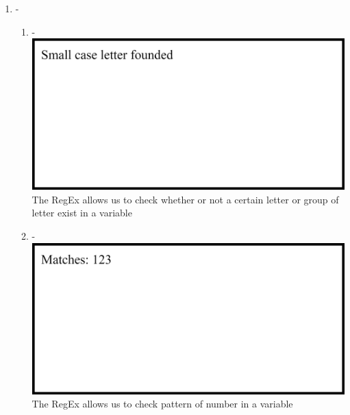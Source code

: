 \documentclass[12pt,titlepage]{article}
\begin{document}
\begin{enumerate}
    \item -
    \begin{enumerate}
        \item - \\ \includegraphics[width=.85\textwidth]{images/figures/fig5.1.png} \\ The RegEx allows us to check whether or not a certain letter or group of letter exist in a variable
        \item - \\ \includegraphics[width=.85\textwidth]{images/figures/fig5.2.png} \\ The RegEx allows us to check pattern of number in a variable
        
        \newpage
        

\end{enumerate}
\end{enumerate}
\end{document}
